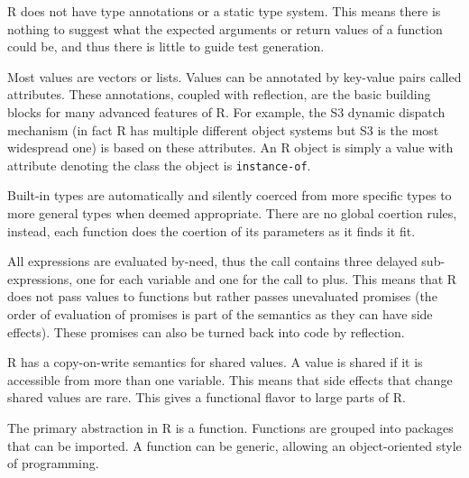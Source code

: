 \documentclass[sigplan,anonymous,review]{acmart}
\begin{document}
\begin{compactitem}[$-$]

\item R does not have type annotations or a static type system. This means
    there is nothing to suggest what the expected arguments or return values of
    a function could be, and thus there is little to guide test generation.

\item Most values are vectors or lists. Values can be annotated by key-value
    pairs called attributes. These annotations, coupled with reflection, are
    the basic building blocks for many advanced features of R. For example, the
    S3 dynamic dispatch mechanism (in fact R has multiple different object
    systems but S3 is the most widespread one) is based on these attributes. An
    R object is simply a value with  attribute denoting the class
    the object is \texttt{instance-of}.

\item Built-in types are automatically and silently coerced from more specific
    types to more general types when deemed appropriate. There are no global
    coertion rules, instead, each function does the coertion of its parameters
    as it finds it fit.

\item All expressions are evaluated by-need, thus the call 
    contains three delayed sub-expressions, one for each variable and one for
    the call to plus. This means that R does not pass values to functions but
    rather passes unevaluated promises (the order of evaluation of promises is
    part of the semantics as they can have side effects). These promises can
    also be turned back into code by reflection.

\item R has a copy-on-write semantics for shared values. A value is shared if
    it is accessible from more than one variable. This means that side effects
    that change shared values are rare. This gives a functional flavor to large
    parts of R.

\item The primary abstraction in R is a function. Functions are grouped into
    packages that can be imported. A function can be generic, allowing an
    object-oriented style of programming.  

\end{compactitem}
\end{document}
